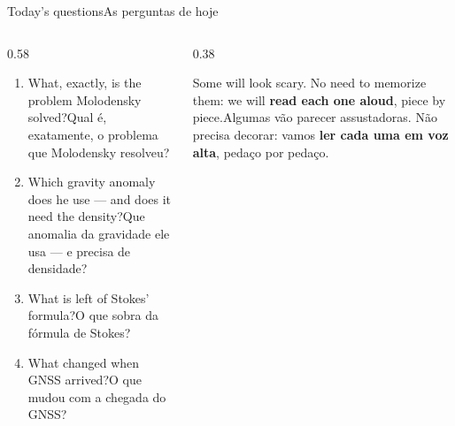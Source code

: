 \documentclass[aspectratio=169,11pt]{beamer}
\newcommand{\tr}[2]{\ifEN#2\else#1\fi}
\newcommand{\bnum}[1]{\textbf{\textcolor{mTeal}{#1}}}
\begin{document}
\begin{frame}{\tr{As perguntas de hoje}{Today's questions}}
  \begin{columns}[T]
    \begin{column}{0.58\textwidth}
      \begin{enumerate}
        \setlength{\itemsep}{8pt}
        \item \tr{Qual é, exatamente, o problema que Molodensky resolveu?}{What, exactly, is the
              problem Molodensky solved?}
        \item \tr{Que anomalia da gravidade ele usa --- e precisa de densidade?}{Which gravity
              anomaly does he use --- and does it need the density?}
        \item \tr{O que sobra da fórmula de Stokes?}{What is left of Stokes' formula?}
        \item \tr{O que mudou com a chegada do GNSS?}{What changed when GNSS arrived?}
      \end{enumerate}
    \end{column}
    \begin{column}{0.38\textwidth}
      \begin{ideia}[title={\tr{Hoje tem fórmula}{Formulas today}}]
        \tr{Algumas vão parecer assustadoras. Não precisa decorar: vamos \bnum{ler cada uma em
        voz alta}, pedaço por pedaço.}{Some will look scary. No need to memorize them: we will
        \bnum{read each one aloud}, piece by piece.}
      \end{ideia}
    \end{column}
  \end{columns}
\end{frame}
\end{document}
